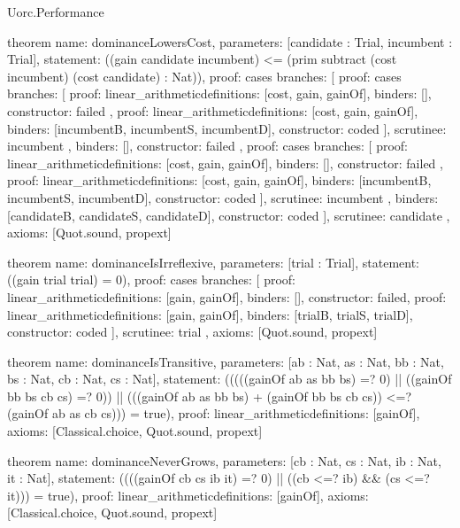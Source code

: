 \begin{lexlean}{Uorc.Performance}
\begin{semanticmodule}
theorem{
  name: dominanceLowersCost,
  parameters: [candidate : Trial, incumbent : Trial],
  statement: ((gain candidate incumbent) <= (prim subtract (cost incumbent) (cost candidate) : Nat)),
  proof: cases{
    branches: [
      {
        proof: cases{
          branches: [
            {
              proof: linear_arithmetic{definitions: [cost, gain, gainOf]},
              binders: [],
              constructor: failed
            },
            {
              proof: linear_arithmetic{definitions: [cost, gain, gainOf]},
              binders: [incumbentB, incumbentS, incumbentD],
              constructor: coded
            }
          ],
          scrutinee: incumbent
        },
        binders: [],
        constructor: failed
      },
      {
        proof: cases{
          branches: [
            {
              proof: linear_arithmetic{definitions: [cost, gain, gainOf]},
              binders: [],
              constructor: failed
            },
            {
              proof: linear_arithmetic{definitions: [cost, gain, gainOf]},
              binders: [incumbentB, incumbentS, incumbentD],
              constructor: coded
            }
          ],
          scrutinee: incumbent
        },
        binders: [candidateB, candidateS, candidateD],
        constructor: coded
      }
    ],
    scrutinee: candidate
  },
  axioms: [Quot.sound, propext]
}

theorem{
  name: dominanceIsIrreflexive,
  parameters: [trial : Trial],
  statement: ((gain trial trial) = 0),
  proof: cases{
    branches: [
      {proof: linear_arithmetic{definitions: [gain, gainOf]}, binders: [], constructor: failed},
      {
        proof: linear_arithmetic{definitions: [gain, gainOf]},
        binders: [trialB, trialS, trialD],
        constructor: coded
      }
    ],
    scrutinee: trial
  },
  axioms: [Quot.sound, propext]
}

theorem{
  name: dominanceIsTransitive,
  parameters: [ab : Nat, as : Nat, bb : Nat, bs : Nat, cb : Nat, cs : Nat],
  statement: (((((gainOf ab as bb bs) =? 0) || ((gainOf bb bs cb cs) =? 0)) || (((gainOf ab as bb bs) + (gainOf bb bs cb cs)) <=? (gainOf ab as cb cs))) = true),
  proof: linear_arithmetic{definitions: [gainOf]},
  axioms: [Classical.choice, Quot.sound, propext]
}

theorem{
  name: dominanceNeverGrows,
  parameters: [cb : Nat, cs : Nat, ib : Nat, it : Nat],
  statement: ((((gainOf cb cs ib it) =? 0) || ((cb <=? ib) && (cs <=? it))) = true),
  proof: linear_arithmetic{definitions: [gainOf]},
  axioms: [Classical.choice, Quot.sound, propext]
}


\end{semanticmodule}
\end{lexlean}

